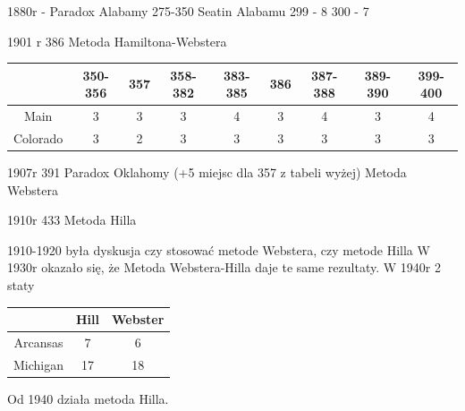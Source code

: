 \documentclass[12pt,a4paper]{article}
\theoremstyle{break}
\begin{document}
	1880r - Paradox Alabamy
	275-350
	Seatin Alabamu 
	299 - 8
	300 - 7
	
	1901 r			386		Metoda Hamiltona-Webstera
	
	\begin{tabular}{|c|c|c|c|c|c|c|c|c|}
		\hline
		&		350-356&	357&	358-382&	383-385&386&	387-388&	389-390&	399-400\\\hline
		Main&3&3&3&4&3&4&3&4\\\hline
		Colorado&3&2&3&3&3&3&3&3\\	\hline
		\end{tabular}
	
	1907r			391		Paradox Oklahomy (+5 miejsc dla 357 z tabeli wyżej) Metoda Webstera
	
	1910r			433 	Metoda Hilla
	
	
	1910-1920 była dyskusja czy stosować metode Webstera, czy metode Hilla
	W 1930r okazało się, że Metoda Webstera-Hilla daje te same rezultaty.
	W 1940r 2 staty
	
	\begin{tabular}{|c|c|c|}\hline
		&Hill&Webster\\\hline
		Arcansas &7&6\\\hline
		Michigan &17 &18\\\hline
	\end{tabular}
	
	Od 1940 działa metoda Hilla.
	
\end{document}
